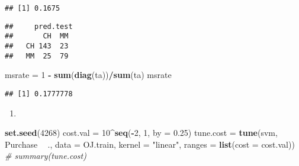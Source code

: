 \documentclass[]{article}
\newenvironment{Shaded}{\begin{snugshade}}{\end{snugshade}}
\newcommand{\CommentTok}[1]{\textcolor[rgb]{0.56,0.35,0.01}{\textit{#1}}}
\newcommand{\DataTypeTok}[1]{\textcolor[rgb]{0.13,0.29,0.53}{#1}}
\newcommand{\DecValTok}[1]{\textcolor[rgb]{0.00,0.00,0.81}{#1}}
\newcommand{\FloatTok}[1]{\textcolor[rgb]{0.00,0.00,0.81}{#1}}
\newcommand{\KeywordTok}[1]{\textcolor[rgb]{0.13,0.29,0.53}{\textbf{#1}}}
\newcommand{\NormalTok}[1]{#1}
\newcommand{\OperatorTok}[1]{\textcolor[rgb]{0.81,0.36,0.00}{\textbf{#1}}}
\newcommand{\StringTok}[1]{\textcolor[rgb]{0.31,0.60,0.02}{#1}}
\begin{document}
\begin{verbatim}
## [1] 0.1675
\end{verbatim}

\begin{Shaded}
\end{Shaded}

\begin{verbatim}
##     pred.test
##       CH  MM
##   CH 143  23
##   MM  25  79
\end{verbatim}

\begin{Shaded}
\begin{Highlighting}[]
\NormalTok{msrate =}\StringTok{ }\DecValTok{1} \OperatorTok{-}\StringTok{ }\KeywordTok{sum}\NormalTok{(}\KeywordTok{diag}\NormalTok{(ta))}\OperatorTok{/}\KeywordTok{sum}\NormalTok{(ta)}
\NormalTok{msrate}
\end{Highlighting}
\end{Shaded}

\begin{verbatim}
## [1] 0.1777778
\end{verbatim}

\begin{enumerate}
\def\labelenumi{(\alph{enumi})}
\setcounter{enumi}{3}
\item
\end{enumerate}

\begin{Shaded}
\begin{Highlighting}[]
\KeywordTok{set.seed}\NormalTok{(}\DecValTok{4268}\NormalTok{)}
\NormalTok{cost.val =}\StringTok{ }\DecValTok{10}\OperatorTok{^}\KeywordTok{seq}\NormalTok{(}\OperatorTok{-}\DecValTok{2}\NormalTok{, }\DecValTok{1}\NormalTok{, }\DataTypeTok{by =} \FloatTok{0.25}\NormalTok{)}
\NormalTok{tune.cost =}\StringTok{ }\KeywordTok{tune}\NormalTok{(svm, Purchase }\OperatorTok{~}\StringTok{ }\NormalTok{., }\DataTypeTok{data =}\NormalTok{ OJ.train, }\DataTypeTok{kernel =} \StringTok{"linear"}\NormalTok{, }\DataTypeTok{ranges =} \KeywordTok{list}\NormalTok{(}\DataTypeTok{cost =}\NormalTok{ cost.val))}
\CommentTok{# summary(tune.cost)}
\end{Highlighting}
\end{Shaded}
\end{document}
